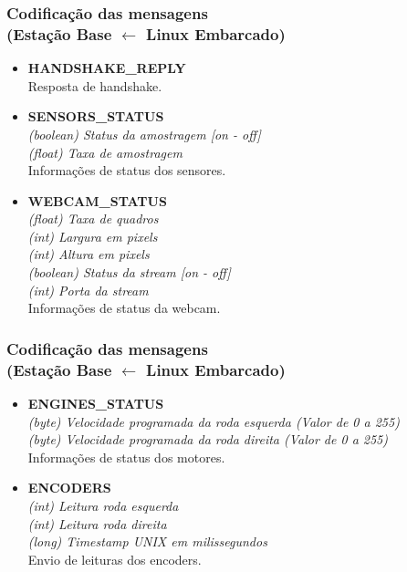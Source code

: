 \documentclass{beamer}
\begin{document}
  \begin{frame}
	\frametitle{Codificação das mensagens\\ (Estação Base $\leftarrow$ Linux Embarcado)}
	\begin{itemize}
		\item \textbf{HANDSHAKE\_REPLY}\\
		Resposta de handshake.

		\item \textbf{SENSORS\_STATUS} \\
		\textit{(boolean) Status da amostragem [on - off] }\\
		\textit{(float) Taxa de amostragem}\\
		Informações de status dos sensores.

		\item \textbf{WEBCAM\_STATUS} \\
		\textit{(float) Taxa de quadros }\\
		\textit{(int) Largura em pixels }\\
		\textit{(int) Altura em pixels }\\
		\textit{(boolean) Status da stream [on - off] }\\
		\textit{(int) Porta da stream}\\
		Informações de status da webcam.
		
		\end{itemize}
	\end{frame}
	\begin{frame}
	\frametitle{Codificação das mensagens\\ (Estação Base $\leftarrow$ Linux Embarcado)}
		\begin{itemize}
			
		\item \textbf{ENGINES\_STATUS} \\
		\textit{(byte) Velocidade programada da roda esquerda (Valor de 0 a 255) }\\
		\textit{(byte) Velocidade programada da roda direita (Valor de 0 a 255)}\\
		Informações de status dos motores.

		\item \textbf{ENCODERS} \\
		\textit{(int) Leitura roda esquerda }\\
		\textit{(int) Leitura roda direita }\\
		\textit{(long) Timestamp UNIX em milissegundos}\\
		Envio de leituras dos encoders.
		
		\end{itemize}
	\end{frame}
\end{document}
